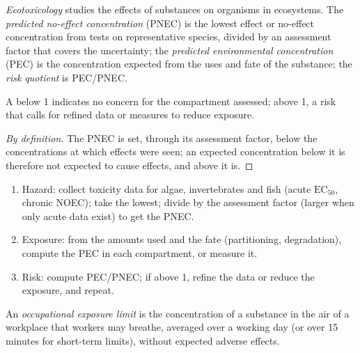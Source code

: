 \begin{definition}[Ecotoxicology]\label{def:b3:environmental-toxicology:ecotoxicology}
\emph{Ecotoxicology} studies the effects of substances on
organisms in ecosystems. The \emph{predicted no-effect
concentration} (PNEC) is the lowest
effect or no-effect concentration from tests on representative species,
divided by an assessment factor that covers the uncertainty; the
\emph{predicted environmental concentration} (PEC) is the concentration expected from the uses and fate of the
substance; the \emph{risk quotient} is PEC/PNEC.
\end{definition}

\begin{proposition}\label{prop:b3:environmental-toxicology:risk-quotient}
A  below 1 indicates no concern for the compartment assessed; above
1, a risk that calls for refined data or measures to reduce exposure.
\end{proposition}

\begin{proof}[By definition]
The PNEC is set, through its assessment factor, below the concentrations at which
effects were seen; an expected concentration below it is therefore not
expected to cause effects, and above it is.
\end{proof}

\begin{method}\label{met:b3:environmental-toxicology:risk}
\begin{enumerate}
  \item Hazard: collect toxicity data for algae, invertebrates and fish (acute
        $\mathrm{EC_{50}}$, chronic NOEC); take the lowest; divide by the assessment factor (larger when
        only acute data exist) to get the PNEC.
  \item Exposure: from the amounts used and the fate (partitioning, degradation),
        compute the PEC in each compartment, or measure it.
  \item Risk: compute PEC/PNEC; if above 1, refine the data or reduce the
        exposure, and repeat.
\end{enumerate}
\end{method}

\begin{definition}\label{def:b3:environmental-toxicology:oel}
An \emph{occupational exposure limit} is the
concentration of a substance in the air of a workplace that workers may breathe,
averaged over a working day (or over 15 minutes for short-term limits), without
expected adverse effects.
\end{definition}

